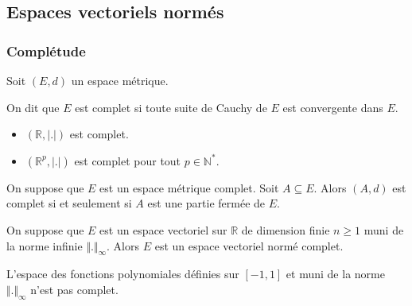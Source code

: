 




  \subsection{Espaces vectoriels normés}

  \subsubsection{Complétude}

  \label{206-1}


  Soit $(E, d)$ un espace métrique.

  \begin{definition}
    On dit que $E$ est complet si toute suite de Cauchy de $E$ est convergente dans $E$.
  \end{definition}

  \begin{example}
    \begin{itemize}
      \item $(\mathbb{R}, \vert . \vert)$ est complet.
      \item $(\mathbb{R}^p, \vert . \vert)$ est complet pour tout $p \in \mathbb{N}^*$.
    \end{itemize}
  \end{example}

  \begin{proposition}
    On suppose que $E$ est un espace métrique complet. Soit $A \subseteq E$. Alors $(A,d)$ est complet si et seulement si $A$ est une partie fermée de $E$.
  \end{proposition}

  \begin{proposition}
    On suppose que $E$ est un espace vectoriel sur $\mathbb{R}$ de dimension finie $n \geq 1$ muni de la norme infinie $\Vert . \Vert_\infty$. Alors $E$ est un espace vectoriel normé complet.
  \end{proposition}

  \begin{cexample}
    L'espace des fonctions polynomiales définies sur $[-1,1]$ et muni de la norme $\Vert . \Vert_{\infty}$ n'est pas complet.
  \end{cexample}

